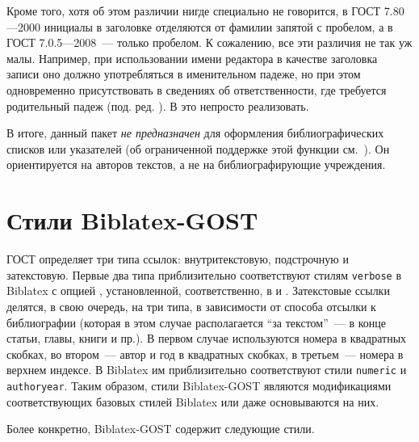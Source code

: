 \documentclass[10pt,a4paper,headings=small,numbers=enddot,english,russian]{ltxdockit}
\newcommand*{\biblatex}{Biblatex\xspace}
\newcommand*{\biblatexgost}{Biblatex-GOST\xspace}
\newcommand*{\bibsty}{\texttt}
\newcommand*{\gostcitename}[1][]{ГОСТ#1 7.0.5---2008\xspace}
\newcommand*{\gostheadname}[1][]{ГОСТ#1 7.80---2000\xspace}
\begin{document}
Кроме того, хотя об этом различии нигде специально не говорится,
  в \gostheadname инициалы в заголовке отделяются от фамилии запятой с пробелом, а в
  \gostcitename~--- только пробелом.
К сожалению, все эти различия не так уж малы.
Например, при использовании имени редактора в качестве заголовка записи оно должно употребляться
  в именительном падеже, но при этом одновременно присутствовать в сведениях
  об ответственности, где требуется родительный падеж (под. ред. \textellipsis).
В \latex это непросто реализовать.

В итоге, данный пакет \emph{не предназначен} для оформления библиографических списков или
  указателей
  (об ограниченной поддержке этой функции см.~).
Он ориентируется на авторов текстов, а не на библиографирующие учреждения.

\section{Стили \biblatexgost}
\label{sec:styles}

ГОСТ определяет три типа ссылок: внутритекстовую, подстрочную и затекстовую.
Первые два типа приблизительно соответствуют стилям \bibsty{verbose} в \biblatex
с опцией , установленной, соответственно, в  и
. Затекстовые ссылки делятся, в свою очередь, на три типа, в зависимости
от способа отсылки к библиографии (которая в этом случае располагается
\enquote{за текстом}~--- в конце статьи, главы, книги и пр.).
В первом случае используются номера в квадратных скобках, во
втором~--- автор и год в квадратных скобках, в третьем~--- номера в верхнем индексе.
В \biblatex им приблизительно
соответствуют стили \bibsty{numeric} и \bibsty{authoryear}. Таким образом,
стили \biblatexgost являются модификациями соответствующих базовых стилей
\biblatex или даже основываются на них.

Более конкретно, \biblatexgost содержит следующие стили.
\end{document}
